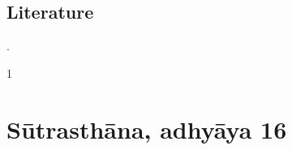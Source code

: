 \documentclass[12pt]{article}
\begin{document}
  
  \subsection{Literature}
  \cites[IA, 204]{meul-hist}{prei-2007}[82--83, \emph{et passim}]{wujad-2012}. 
    
    \begin{translation}    
        \item [1] 
        
    \end{translation}
    
    \newpage
    
    \section{Sūtrasthāna, adhyāya 16}
    
\end{document}
